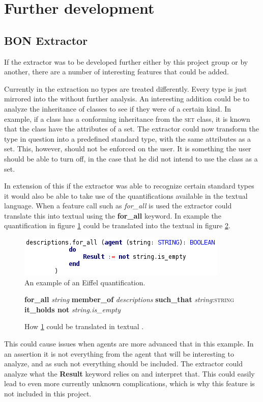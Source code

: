 \section{Further development}
\subsection{BON Extractor}
If the \bon{} extractor was to be developed further either by this project group or by another, there are a number of interesting features that could be added. 

Currently in the \bon{} extraction no types are treated differently. Every type is just mirrored into the \bon{} without further analysis. An interesting addition could be to analyze the inheritance of classes to see if they were of a certain kind. In example, if a class has a conforming inheritance from the \textsc{set} class, it is known that the class have the attributes of a set. The extractor could now transform the type in question into a predefined standard type, with the same attributes as a set. This, however, should not be enforced on the user. It is something the user should be able to turn off, in the case that he did not intend to use the class as a set.

In extension of this if the extractor was able to recognize certain standard types it would also be able to take use of the quantifications available in the textual \bon{} language. When a feature call such as \textit{for\_all} is used the extractor could translate this into textual \bon{} using the \textbf{for\_all} keyword. In example the quantification in figure \ref{fig:agent-for-all} could be translated into the textual \bon{} in figure \ref{fig:bon-for-all}.
\begin{figure}[h]
\centerline{
\includegraphics[scale=0.7]{images/agent_example.png} 
}
\caption{An example of an Eiffel quantification.}
\label{fig:agent-for-all}
\end{figure}

\begin{figure}[h]
\centerline{
\footnotesize{\textbf{for\_all} \textit{string} \textbf{member\_of} \textit{descriptions} \textbf{such\_that} \textit{string}:\textsc{string} \textbf{it\_holds not} \textit{string.is\_empty}}
}
\caption{How \ref{fig:agent-for-all} could be translated in textual \bon.}
\label{fig:bon-for-all}
\end{figure}
This could cause issues when agents are more advanced that in this example. In an assertion it is not everything from the agent that will be interesting to analyze, and as such not everything should be included. The extractor could analyze what the \textbf{Result} keyword relies on and interpret that. This could easily lead to even more currently unknown complications, which is why this feature is not included in this project.

